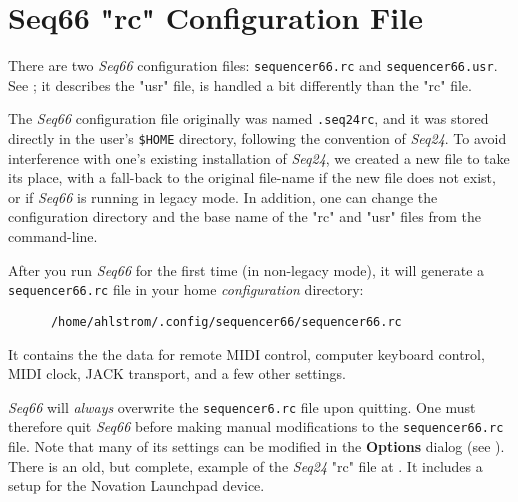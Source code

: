 %
%
%

\section{Seq66 "rc" Configuration File}
\label{sec:seq66_rc_file}

   There are two \textsl{Seq66} configuration files:
   \texttt{sequencer66.rc} and \texttt{sequencer66.usr}.
   See ; it describes the "usr" file,
   is handled a bit differently than the "rc" file.

   The \textsl{Seq66} configuration file originally was
   named \texttt{.seq24rc},
   and it was stored directly in the user's \texttt{\$HOME} directory,
   following the convention of \textsl{Seq24}.
   To avoid interference with one's existing installation of 
   \textsl{Seq24}, we created a new file
   to take its place, with a fall-back to the original file-name if the new
   file does not exist, or if \textsl{Seq66} is running in
   legacy mode.
   In addition, one can change the configuration directory and the base name of
   the "rc" and "usr" files from the command-line.

   After you run \textsl{Seq66} for the first time (in non-legacy
   mode), it will generate a \texttt{sequencer66.rc} file in your home
   \textsl{configuration} directory:

   \begin{verbatim}
      /home/ahlstrom/.config/sequencer66/sequencer66.rc
   \end{verbatim}

   It contains the the data for remote MIDI control, computer keyboard
   control, MIDI clock, JACK transport, and a few other settings.

   \textsl{Seq66} will
   \textsl{always} overwrite the \texttt{sequencer6.rc} file upon
   quitting.  One must therefore quit \textsl{Seq66} before making
   manual modifications to the \texttt{sequencer66.rc} file.
   Note that many of
   its settings can be modified in the \textbf{Options} dialog
   (see ).
   There is an old, but complete, example of the \textsl{Seq24}
   "rc" file at \cite{seq24launchpadmapper}.
   It includes a setup for the
   Novation Launchpad device.

